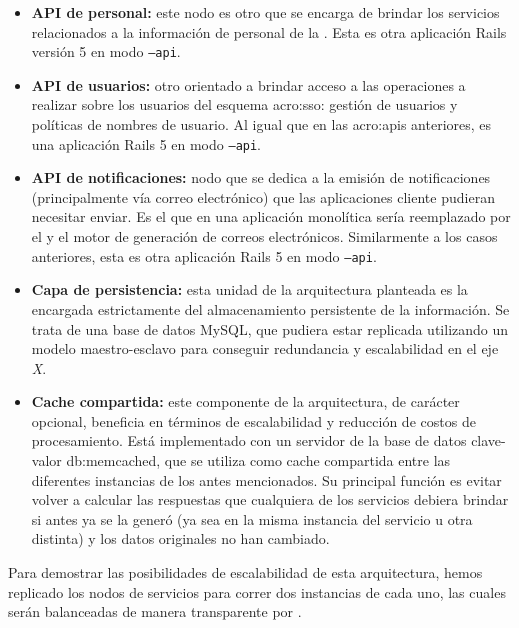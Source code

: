 \begin{itemize}
  \item \textbf{API de personal:} este nodo es otro  que se encarga de brindar los servicios relacionados a la información de personal de la {\unlp}. Esta es otra aplicación Rails versión 5 en modo \texttt{--api}.

  \item \textbf{API de usuarios:} otro  orientado a brindar acceso a las operaciones a realizar sobre los usuarios del esquema \gls{acro:sso}: gestión de usuarios y políticas de nombres de usuario. Al igual que en las \glspl{acro:api} anteriores, es una aplicación Rails 5 en modo \texttt{--api}.

  \item \textbf{API de notificaciones:} nodo que se dedica a la emisión de notificaciones (principalmente vía correo electrónico) que las aplicaciones cliente pudieran necesitar enviar. Es el  que en una aplicación monolítica sería reemplazado por el  y el motor de generación de correos electrónicos. Similarmente a los casos anteriores, esta es otra aplicación Rails 5 en modo \texttt{--api}.

  \item \textbf{Capa de persistencia:} esta unidad de la arquitectura planteada es la encargada estrictamente del almacenamiento persistente de la información. Se trata de una base de datos MySQL, que pudiera estar replicada utilizando un modelo maestro-esclavo para conseguir redundancia y escalabilidad en el eje \textit{X}.

  \item \textbf{Cache compartida:} este componente de la arquitectura, de carácter opcional, beneficia en términos de escalabilidad y reducción de costos de procesamiento. Está implementado con un servidor de la base de datos clave-valor \gls{db:memcached}, que se utiliza como cache compartida entre las diferentes instancias de los  antes mencionados. Su principal función es evitar volver a calcular las respuestas que cualquiera de los servicios debiera brindar si antes ya se la generó (ya sea en la misma instancia del servicio u otra distinta) y los datos originales no han cambiado.
\end{itemize}

Para demostrar las posibilidades de escalabilidad de esta arquitectura, hemos replicado los nodos de servicios para correr dos instancias de cada uno, las cuales serán balanceadas de manera transparente por .

